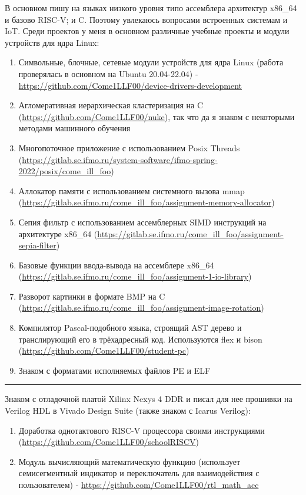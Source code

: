 \documentclass[10pt, final, twoside]{article}
\begin{document}
В основном пишу на языках низкого уровня типо ассемблера архитектур x86\_64 и базово RISC-V; и C. Поэтому увлекаюсь вопросами встроенных системам и IoT. Среди проектов у меня в основном различные учебные проекты и модули устройств для ядра Linux:
\begin{enumerate}
  \item Символьные, блочные, сетевые модули устройств для ядра Linux (работа проверялась в основном на Ubuntu 20.04-22.04) - \url{https://github.com/Come1LLF00/device-drivers-development}
  \item Агломеративная иерархическая кластеризация на C (\url{https://github.com/Come1LLF00/nuke}), так что да я знаком с некоторыми методами машинного обучения
  \item Многопоточное приложение с использованием Posix Threads (\url{https://gitlab.se.ifmo.ru/system-software/ifmo-spring-2022/posix/come_ill_foo})
  \item Аллокатор памяти с использованием системного вызова mmap (\url{https://gitlab.se.ifmo.ru/come_ill_foo/assignment-memory-allocator})
  \item Сепия фильтр с использованием ассемблерных SIMD инструкций на архитектуре x86\_64 (\url{https://gitlab.se.ifmo.ru/come_ill_foo/assignment-sepia-filter})
  \item Базовые функции ввода-вывода на ассемблере x86\_64 (\url{https://gitlab.se.ifmo.ru/come_ill_foo/assignment-1-io-library})
  \item Разворот картинки в формате BMP на C (\url{https://gitlab.se.ifmo.ru/come_ill_foo/assignment-image-rotation})
  \item Компилятор Pascal-подобного языка, строящий AST дерево и транслирующий его в трёхадресный код. Используются flex и bison (\url{https://github.com/Come1LLF00/student-pc})
  \item Знаком с форматами исполняемых файлов PE и ELF
\end{enumerate}

\par\noindent\rule{\textwidth}{0.1pt}

Знаком с отладочной платой Xilinx Nexys 4 DDR и писал для нее прошивки на Verilog HDL в Vivado Design Suite (также знаком с Icarus Verilog):
\begin{enumerate}
  \item Доработка однотактового RISC-V процессора своими инструкциями (\url{https://github.com/Come1LLF00/schoolRISCV})
  \item Модуль вычисляющий математическую функцию (использует семисегментный индикатор и переключатель для взаимодействия с пользователем) - \url{https://github.com/Come1LLF00/rtl_math_acc}
\end{enumerate}
\end{document}
